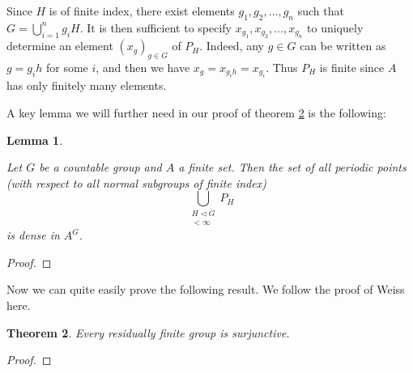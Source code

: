 \documentclass[titlepage, a4paper]{article}
\theoremstyle{theoremdd}
\newtheorem{theorem}{Theorem}[section]
\newtheorem{lemma}[theorem]{Lemma}
\theoremstyle{definition}
\theoremstyle{remark}
\begin{document}

Since $H$ is of finite index, there exist elements $g_1, g_2, \dots, g_n$ such that $G = \bigcup_{i=1}^n g_i H$. It is then sufficient to specify $x_{g_1}, x_{g_2}, \dots, x_{g_n}$ to uniquely determine an element $(x_g)_{g \in G}$ of $P_H$. Indeed, any $g \in G$ can be written as $g = g_ih$ for some $i$, and then we have $x_g = x_{g_ih} = x_{g_i}$. Thus $P_H$ is finite since $A$ has only finitely many elements.

A key lemma we will further need in our proof of theorem \ref{thm:res_fin_surjunctive} is the following:

\begin{lemma} \label{lem:h-periodic_points}
    
Let $G$ be a countable group and $A$ a finite set. Then the set of all periodic points (with respect to all normal subgroups of finite index)
    \[
    \bigcup_{\substack{ H \triangleleft G \\ [G : H] < \infty}} P_H
    \]
is dense in $A^G$.
\end{lemma}
\begin{proof}
% 

\end{proof}

Now we can quite easily prove the following result. We follow the proof of Weiss \cite[Theorem 1.3]{weiss_2000} here.
\begin{theorem} \label{thm:res_fin_surjunctive}
    Every residually finite group is surjunctive.
\end{theorem}
\begin{proof}
    
\end{proof}
\end{document}
